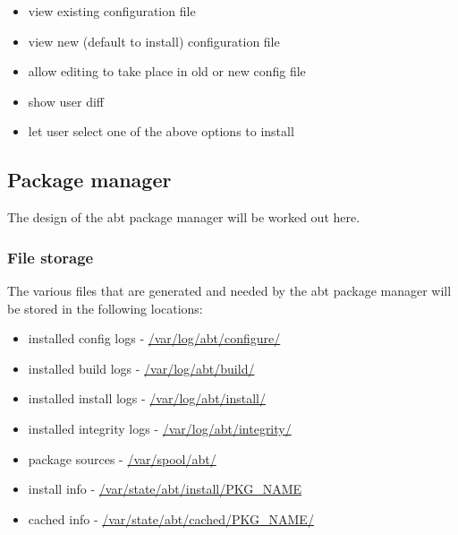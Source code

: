 \begin{itemize}
	\item view existing configuration file
	\item view new (default to install) configuration file
	\item allow editing to take place in old or new config file
	\item show user diff
	\item let user select one of the above options to install
\end{itemize}


\subsection{Package manager}
The design of the abt package manager will be worked out here.

\subsubsection{File storage}
The various files that are generated and needed by the abt package manager will be stored in the following locations:

\begin{itemize}
	\item installed config logs - \url{/var/log/abt/configure/}
	\item installed build logs - \url{/var/log/abt/build/}
	\item installed install logs - \url{/var/log/abt/install/}
	\item installed integrity logs - \url{/var/log/abt/integrity/}
	\item package sources - \url{/var/spool/abt/}
	\item install info - \url{/var/state/abt/install/PKG_NAME}
	\item cached info - \url{/var/state/abt/cached/PKG_NAME/}
\end{itemize}
